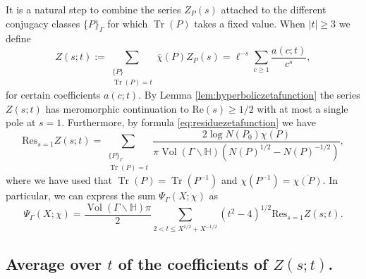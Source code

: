 \documentclass{article}
\theoremstyle{named}
\newcommand{\Hyp}{\mathbb{H}}
\DeclareMathOperator{\vol}{Vol}
\DeclareMathOperator{\Tr}{Tr}
\begin{document}
It is a natural step to combine the series $Z_P(s)$ attached to the different conjugacy classes $\{P\}_\Gamma$ for which $\Tr(P)$ takes a fixed value. When $|t| \geq 3$ we define 
\begin{equation}\label{eq:defiofzagierbykovskiizeta}
    Z(s; t) := \sum_{\substack{\{P\}\\
    \Tr(P) = t}} \overline{\chi}(P)Z_P(s) = \ell^{-s}\sum_{c \geq 1} \frac{a(c; t)}{c^s},
\end{equation}
for certain coefficients $a(c; t)$. By Lemma \ref{lem:hyperboliczetafunction} the series $Z(s; t)$ has meromorphic continuation to $\text{Re}(s) \geq 1/2$ with at most a single pole at $s = 1$. Furthermore, by formula \eqref{eq:residuezetafunction} we have 
\begin{equation}\label{eq:formulaforprimegeodesicasresidues}
    \text{Res}_{s = 1}Z(s; t) = \sum_{\substack{\{P\}_\Gamma\\
    \Tr(P) = t}} \frac{2 \log N(P_0) \chi(P)}{\pi \vol(\Gamma\backslash \Hyp)(N(P)^{1/2} - N(P)^{-1/2})} ,
\end{equation}
where we have used that $\Tr(P) = \Tr(P^{-1})$ and $\chi(P^{-1}) = \overline{\chi(P)}$. In particular, we can express the sum $\Psi_\Gamma(X; \chi)$ as
\begin{equation}\label{eq:secondformulaforprimegeodesicasresidues}
    \Psi_\Gamma(X; \chi) = \frac{\vol(\Gamma\backslash \Hyp)\pi}{2} \sum_{2 < t \leq X^{1/2} + X^{-1/2}} (t^2 - 4)^{1/2} \text{Res}_{s = 1}Z(s; t).
\end{equation}

\subsection{Average over $t$ of the coefficients of $Z(s; t)$.}
\end{document}
